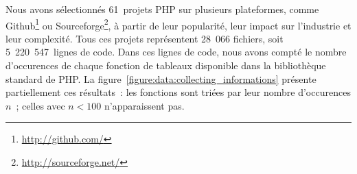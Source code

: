 Nous avons sélectionnés 61~projets PHP sur plusieurs plateformes, comme
Github\footnote{\url{http://github.com/}} ou
Sourceforge\footnote{\url{http://sourceforge.net/}}, à partir de leur
popularité, leur impact sur l'industrie et leur complexité. Tous ces projets
représentent 28~066 fichiers, soit 5~220~547~lignes de code. Dans ces lignes de
code, nous avons compté le nombre d'occurences de chaque fonction de tableaux
disponible dans la bibliothèque standard de PHP. La
figure~\ref{figure:data:collecting_informations} présente partiellement ces
résultats~: les fonctions sont triées par leur nombre d'occurences $n$~; celles
avec $n < 100$ n'apparaissent pas.
%
\begin{figure}

{
\Huge

}
\end{figure}
